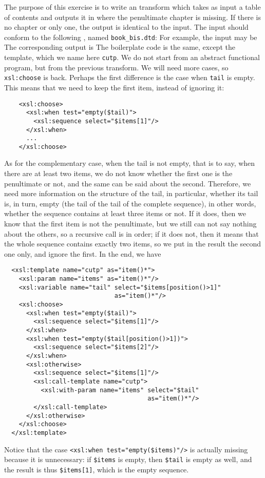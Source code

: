 The purpose of this exercise is to write an \XSLT transform which
takes as input a table of contents and outputs it in \XML where the
penultimate chapter is missing. If there is no chapter or only one,
the output is identical to the input. The input should conform to the
following \DTD, named \texttt{book\_bis.dtd}:
\noindent For example, the input may be
\noindent The corresponding output is
\noindent The boilerplate \XSLT code is the same, except the template,
which we name here \texttt{cutp}. We do not start from an abstract
functional program, but from the previous transform. We will need more
cases, so \texttt{xsl:choose} is back. Perhaps the first difference is
the case when \texttt{tail} is empty. This means that we need to keep
the first item, instead of ignoring it:
\begin{verbatim}
    <xsl:choose>
      <xsl:when test="empty($tail)">
        <xsl:sequence select="$items[1]"/>
      </xsl:when>
      ...
    </xsl:choose>
\end{verbatim}
As for the complementary case, when the tail is not empty, that is to
say, when there are at least two items, we do not know whether the
first one is the penultimate or not, and the same can be said about
the second. Therefore, we need more information on the structure of
the tail, in particular, whether its tail is, in turn, empty (the tail
of the tail of the complete sequence), in other words, whether the
sequence contains at least three items or not. If it does, then we
know that the first item is not the penultimate, but we still can not
say nothing about the others, so a recursive call is in order; if it
does not, then it means that the whole sequence contains exactly two
items, so we put in the result the second one only, and ignore the
first. In the end, we have
\begin{verbatim}
  <xsl:template name="cutp" as="item()*">
    <xsl:param name="items" as="item()*"/>
    <xsl:variable name="tail" select="$items[position()>1]"
                              as="item()*"/>
    <xsl:choose>
      <xsl:when test="empty($tail)">
        <xsl:sequence select="$items[1]"/>
      </xsl:when>
      <xsl:when test="empty($tail[position()>1])">
        <xsl:sequence select="$items[2]"/>
      </xsl:when>
      <xsl:otherwise>
        <xsl:sequence select="$items[1]"/>
        <xsl:call-template name="cutp">
          <xsl:with-param name="items" select="$tail" 
                                       as="item()*"/>
        </xsl:call-template>
      </xsl:otherwise>
    </xsl:choose>
  </xsl:template>
\end{verbatim}
Notice that the case \texttt{<xsl:when test="empty(\$items)"/>} is
actually missing because it is unnecessary: if \texttt{\$items} is
empty, then \texttt{\$tail} is empty as well, and the result is thus
\texttt{\$items[1]}, which is the empty sequence.


